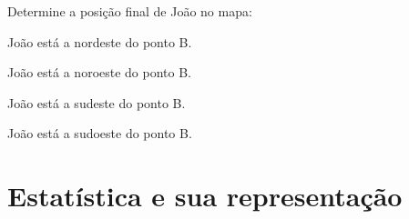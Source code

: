 Determine a posição final de João no mapa:

\begin{escolha}[itemsep=5pt]
\item João está a nordeste do ponto B.
\item João está a noroeste do ponto B.
\item João está a sudeste do ponto B.
\item João está a sudoeste do ponto B.
\end{escolha}


\chapter{Estatística e sua
representação}

